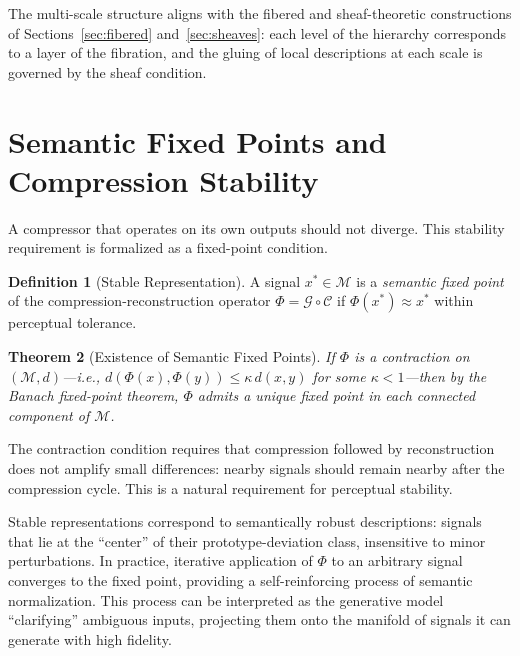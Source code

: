 \documentclass[12pt,a4paper]{article}
\newtheorem{theorem}{Theorem}[section]
\theoremstyle{definition}
\newtheorem{definition}[theorem]{Definition}
\theoremstyle{remark}
\begin{document}
The multi-scale structure aligns with the fibered and sheaf-theoretic constructions of Sections~\ref{sec:fibered} and~\ref{sec:sheaves}: each level of the hierarchy corresponds to a layer of the fibration, and the gluing of local descriptions at each scale is governed by the sheaf condition.

\section{Semantic Fixed Points and Compression Stability}
\label{sec:stability}

A compressor that operates on its own outputs should not diverge. This stability requirement is formalized as a fixed-point condition.

\begin{definition}[Stable Representation]
A signal $x^* \in \mathcal{M}$ is a \emph{semantic fixed point} of the compression-reconstruction operator $\Phi = \mathcal{G} \circ \mathcal{C}$ if $\Phi(x^*) \approx x^*$ within perceptual tolerance.
\end{definition}

\begin{theorem}[Existence of Semantic Fixed Points]
If $\Phi$ is a contraction on $(\mathcal{M}, d)$---i.e., $d(\Phi(x), \Phi(y)) \le \kappa \, d(x,y)$ for some $\kappa < 1$---then by the Banach fixed-point theorem, $\Phi$ admits a unique fixed point in each connected component of $\mathcal{M}$.
\end{theorem}

The contraction condition requires that compression followed by reconstruction does not amplify small differences: nearby signals should remain nearby after the compression cycle. This is a natural requirement for perceptual stability.

Stable representations correspond to semantically robust descriptions: signals that lie at the ``center'' of their prototype-deviation class, insensitive to minor perturbations. In practice, iterative application of $\Phi$ to an arbitrary signal converges to the fixed point, providing a self-reinforcing process of semantic normalization. This process can be interpreted as the generative model ``clarifying'' ambiguous inputs, projecting them onto the manifold of signals it can generate with high fidelity.

\end{document}
